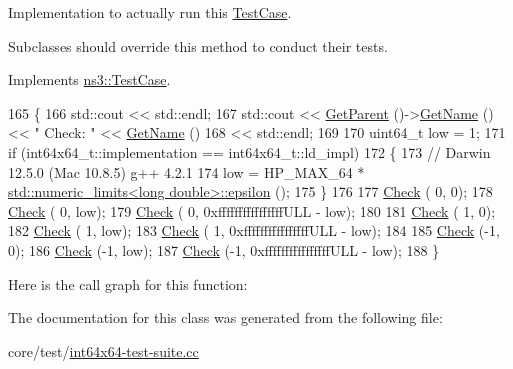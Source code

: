 Implementation to actually run this \hyperlink{classns3_1_1TestCase}{Test\+Case}. 

Subclasses should override this method to conduct their tests. 

Implements \hyperlink{classns3_1_1TestCase_a8ff74680cf017ed42011e4be51917a24}{ns3\+::\+Test\+Case}.


\begin{DoxyCode}
165 \{
166   std::cout << std::endl;
167   std::cout << \hyperlink{classns3_1_1TestCase_af41db0462b844c9f81838d0e61ecd563}{GetParent} ()->\hyperlink{classns3_1_1TestCase_a28f7bb59669c24dae1c290fc17fc9b62}{GetName} () << \textcolor{stringliteral}{" Check: "} << \hyperlink{classns3_1_1TestCase_a28f7bb59669c24dae1c290fc17fc9b62}{GetName} ()
168             << std::endl;
169 
170   uint64\_t low = 1;
171   \textcolor{keywordflow}{if} (int64x64\_t::implementation == int64x64\_t::ld\_impl)
172     \{
173       \textcolor{comment}{// Darwin 12.5.0 (Mac 10.8.5) g++ 4.2.1}
174       low = HP\_MAX\_64 * \hyperlink{tv-spectrum-transmitter-test_8cc_a4904cc82627458fdf6672ccc0b2802c7}{std::numeric\_limits<long double>::epsilon} 
      ();
175     \}
176 
177   \hyperlink{classns3_1_1int64x64_1_1test_1_1Int64x64HiLoTestCase_a9490df4c4737e15e7c7dac4dcadbeec9}{Check} ( 0, 0);
178   \hyperlink{classns3_1_1int64x64_1_1test_1_1Int64x64HiLoTestCase_a9490df4c4737e15e7c7dac4dcadbeec9}{Check} ( 0, low);
179   \hyperlink{classns3_1_1int64x64_1_1test_1_1Int64x64HiLoTestCase_a9490df4c4737e15e7c7dac4dcadbeec9}{Check} ( 0, 0xffffffffffffffffULL - low);
180   
181   \hyperlink{classns3_1_1int64x64_1_1test_1_1Int64x64HiLoTestCase_a9490df4c4737e15e7c7dac4dcadbeec9}{Check} ( 1, 0);
182   \hyperlink{classns3_1_1int64x64_1_1test_1_1Int64x64HiLoTestCase_a9490df4c4737e15e7c7dac4dcadbeec9}{Check} ( 1, low);
183   \hyperlink{classns3_1_1int64x64_1_1test_1_1Int64x64HiLoTestCase_a9490df4c4737e15e7c7dac4dcadbeec9}{Check} ( 1, 0xffffffffffffffffULL - low);
184   
185   \hyperlink{classns3_1_1int64x64_1_1test_1_1Int64x64HiLoTestCase_a9490df4c4737e15e7c7dac4dcadbeec9}{Check} (-1, 0);
186   \hyperlink{classns3_1_1int64x64_1_1test_1_1Int64x64HiLoTestCase_a9490df4c4737e15e7c7dac4dcadbeec9}{Check} (-1, low);
187   \hyperlink{classns3_1_1int64x64_1_1test_1_1Int64x64HiLoTestCase_a9490df4c4737e15e7c7dac4dcadbeec9}{Check} (-1, 0xffffffffffffffffULL - low);
188 \}
\end{DoxyCode}


Here is the call graph for this function\+:




The documentation for this class was generated from the following file\+:\begin{DoxyCompactItemize}
\item 
core/test/\hyperlink{int64x64-test-suite_8cc}{int64x64-\/test-\/suite.\+cc}\end{DoxyCompactItemize}
